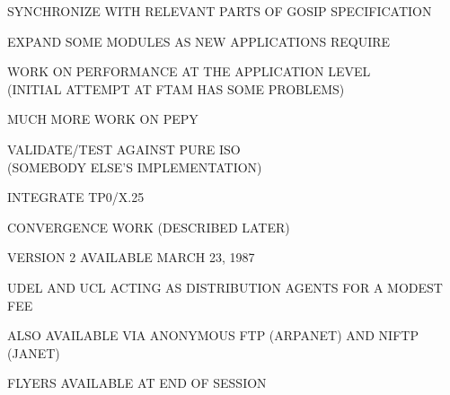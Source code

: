 

\makeatletter
\def\NR@logo{\vtop{\halign{\hfil##\hfil\cr\Large\bf UPDATE\cr}}}
\let\NR@titlelogo=\NR@logo
\makeatother

\raggedright



\setcounter{slide}{8}

\begin{bwslide}

\begin{nrtc}
\item	SYNCHRONIZE WITH RELEVANT PARTS OF GOSIP SPECIFICATION

\item	EXPAND SOME MODULES AS NEW APPLICATIONS REQUIRE

\item	WORK ON PERFORMANCE AT THE APPLICATION LEVEL\\
	(INITIAL ATTEMPT AT FTAM HAS SOME PROBLEMS)

\item	MUCH MORE WORK ON PEPY

\item	VALIDATE/TEST AGAINST PURE ISO\\
	(SOMEBODY ELSE'S IMPLEMENTATION)

\item	INTEGRATE TP0/X.25

\item	CONVERGENCE WORK (DESCRIBED LATER)
\end{nrtc}
\end{bwslide}


\begin{bwslide}

\begin{nrtc}
\item	VERSION 2 AVAILABLE MARCH 23, 1987

\item	UDEL AND UCL ACTING AS DISTRIBUTION AGENTS FOR A MODEST FEE

\item	ALSO AVAILABLE VIA ANONYMOUS FTP (ARPANET) AND NIFTP (JANET)

\item	FLYERS AVAILABLE AT END OF SESSION
\end{nrtc}
\end{bwslide}



